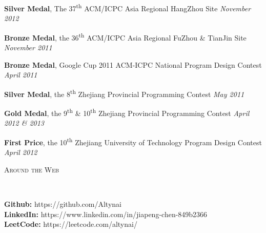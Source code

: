 ﻿\documentclass[9pt]{article}
\newenvironment{changemargin}[2]{%
  \begin{list}{}{%
    \setlength{\topsep}{0pt}%
    \setlength{\leftmargin}{#1}%
    \setlength{\rightmargin}{#2}%
    \setlength{\listparindent}{\parindent}%
    \setlength{\itemindent}{\parindent}%
    \setlength{\parsep}{\parskip}%
  }%
  \item[]}{\end{list}
}
\newcommand{\lineover}{
	\begin{changemargin}{-0.05in}{-0.05in}
		\vspace*{-8pt}
		\hrulefill \\
		\vspace*{-2pt}
	\end{changemargin}
}
\newcommand{\header}[1]{
	\begin{changemargin}{-0.5in}{-0.5in}
		\scshape{#1}\\
  	\lineover
	\end{changemargin}
}
\newenvironment{body} {
	\vspace*{-16pt}
	\begin{changemargin}{-0.25in}{-0.5in}
  }
	{\end{changemargin}
}
\newcommand\nth{\textsuperscript{th}} %
\begin{document}
\begin{body}
	\vspace{14pt}

	\textbf{Silver Medal}, The 37\nth{} ACM/ICPC Asia Regional HangZhou Site \hfill{} \emph{November 2012}\\
	\smallskip

	\textbf{Bronze Medal}, the 36\nth{} ACM/ICPC Asia Regional FuZhou \& TianJin Site \hfill{} \emph{November 2011}\\
	\smallskip

	\textbf{Bronze Medal}, Google Cup 2011 ACM-ICPC National Program Design Contest \hfill{} \emph{April 2011}\\
	\smallskip

	\textbf{Silver Medal}, the 8\nth{} Zhejiang Provincial Programming Contest \hfill{} \emph{May 2011}\\
	\smallskip

	\textbf{Gold Medal}, the 9\nth{} \& 10\nth{} Zhejiang Provincial Programming Contest \hfill{} \emph{April 2012 \& 2013}\\
	\smallskip

	\textbf{First Price}, the 10\nth{} Zhejiang University of Technology Program Design Contest \hfill{} \emph{April 2012}\\
\end{body}

\smallskip

\header{Around the Web}

\begin{body}
	\vspace{14pt}
    \textbf{Github:} https://github.com/Altynai \\
    \textbf{LinkedIn:} https://www.linkedin.com/in/jiapeng-chen-849b2366 \\
    \textbf{LeetCode:} https://leetcode.com/altynai/ \\
\end{body}
\end{document}
